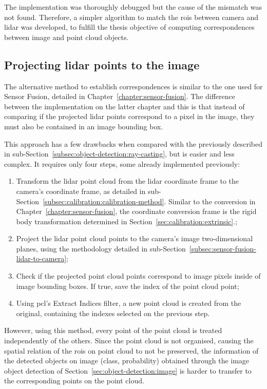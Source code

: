 The implementation was thoroughly debugged but the cause of the mismatch was not found. Therefore, a simpler algorithm to match the \acp{roi} between camera and \ac{lidar} was developed, to fulfill the thesis objective of computing correspondences between image and point cloud objects.


\subsection{Projecting \ac{lidar} points to the image}
\label{subsec:object-detection:projection-correspondences}

The alternative method to establish correspondences is similar to the one used for Sensor Fusion, detailed in Chapter~\ref{chapter:sensor-fusion}. The difference between the implementation on the latter chapter and this is that instead of comparing if the projected \ac{lidar} points correspond to a pixel in the image, they must also be contained in an image bounding box. 

This approach has a few drawbacks when compared with the previously described in sub-Section~\ref{subsec:object-detection:ray-casting}, but is easier and less complex. It requires only four steps, some already implemented previously:

\begin{enumerate}
	\item Transform the \ac{lidar} point cloud from the \ac{lidar} coordinate frame to the camera's coordinate frame, as detailed in sub-Section~\ref{subsec:calibration:calibration-method}. Similar to the conversion in Chapter~\ref{chapter:sensor-fusion}, the coordinate conversion frame is the rigid body transformation determined in Section~\ref{sec:calibration:extrinsic}.;
	\item Project the \ac{lidar} point cloud points to the camera's image two-dimensional planes, using the methodology detailed in sub-Section~\ref{subsec:sensor-fusion-lidar-to-camera};
	\item Check if the projected point cloud points correspond to image pixels inside of image bounding boxes. If true, save the index of the point cloud point;
	\item Using \ac{pcl}'s Extract Indices filter, a new point cloud is created from the original, containing the indexes selected on the previous step.
\end{enumerate}

However, using this method, every point of the point cloud is treated independently of the others. Since the point cloud is not organised, causing the spatial relation of the \acp{roi} on point cloud to not be preserved, the information of the detected objects on image (class, probability) obtained through the image object detection of Section~\ref{sec:object-detection:image} is harder to transfer to the corresponding points on the point cloud.


